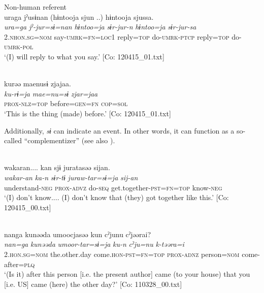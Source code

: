 \ex
  Non-human referent\\
{\TM}
\glll uraga  jˀusɨnan  (hɨntooja  sjun ..)    hɨntooja  sjussa.\\
\textit{ura=ga}  \textit{jˀ-jur=sɨ=nan}  \textit{hɨntoo=ja}  \textit{sɨr-jur-n} \textit{hɨntoo=ja}  \textit{sɨr-jur-sa}\\
2.\textsc{nhon}.\textsc{sg}=\textsc{nom}  say-\textsc{umrk}=\textsc{fn}=\textsc{loc1}  reply=\textsc{top}  do-\textsc{umrk}-\textsc{ptcp}   reply=\textsc{top}  do-\textsc{umrk}-\textsc{pol}\\
\glt ‘(I) will reply to what you say.’ [Co: 120415\_01.txt]
\z

\ex{}\\
{\TM}
\glll  kurəə  {\textbar}mae{\textbar}nusɨ  zjajaa.\\
\textit{ku-rɨ=ja}  \textit{mae=nu=sɨ}  \textit{zjar=jaa}\\
\textsc{prox}-\textsc{nlz}=\textsc{top}  before=\textsc{gen}=\textsc{fn}  \textsc{cop}=\textsc{sol}\\
\glt ‘This is the thing (made) before.’ [Co: 120415\_01.txt]
\z

Additionally, \textit{sɨ} can indicate an event. In other words, it can function as a so-called “complementizer” (see also ).

\ea\label{ex:6-11}
\ea{}\\
{\TM}
\glll  wakaran....  kan  sjɨ  juratasəə sijan.\\
\textit{wakar-an}  \textit{ka-n}  \textit{sɨr-tɨ}  \textit{juraw-tar=sɨ=ja} \textit{sij-an}\\
understand-\textsc{neg}  \textsc{prox}-\textsc{advz}  do-\textsc{seq}  get.together-\textsc{pst}=\textsc{fn}=\textsc{top}     know-\textsc{neg}\\
\glt ‘(I) don’t know.... (I) don’t know that (they) got together like this.’ [Co: 120415\_00.txt]
\z

\ex{}\\
{\TM}
\glll  nanga  kunəəda  umoocjasəə  kun  cˀjunu  cˀjəərai?\\
\textit{nan=ga}  \textit{kunəəda}  \textit{umoor-tar=sɨ=ja}  \textit{ku-n}   \textit{cˀju=nu}  \textit{k-təəra=i}\\
2.\textsc{hon}.\textsc{sg}=\textsc{nom}  the.other.day  come.\textsc{hon}-\textsc{pst}=\textsc{fn}=\textsc{top}  \textsc{prox}-\textsc{adnz}   person=\textsc{nom}  come-after=\textsc{plq}\\
\glt ‘(Is it) after this person [i.e. the present author] came (to your house) that you [i.e. US] came (here) the other day?’ [Co: 110328\_00.txt]
\z

